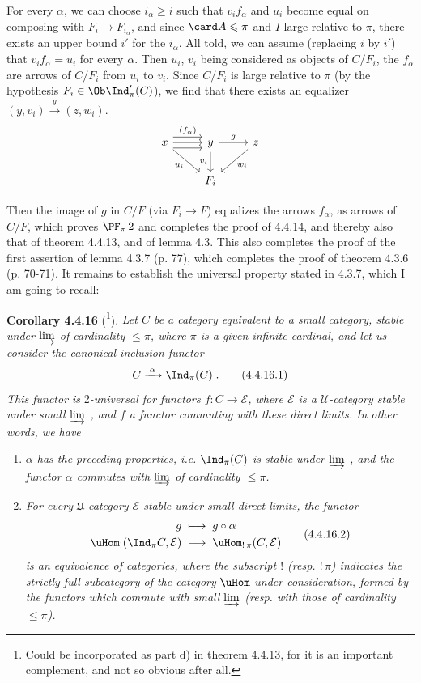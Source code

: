 For every $\alpha$, we can choose $i_\alpha\geqslant i$ such that $v_if_\alpha$ and $u_i$ become equal on composing with $F_i\longrightarrow F_{i_\alpha}$, and since $\card A\leqslant\pi$ and $I$ large relative to $\pi$, there exists an upper bound $i'$ for the $i_\alpha$. All told, we can assume (replacing $i$ by $i'$) that $v_if_\alpha=u_i$ for every $\alpha$. Then $u_i$, $v_i$ being considered as objects of $C/F_i$, the $f_\alpha$ are arrows of $C/F_i$ from $u_i$ to $v_i$. Since $C/F_i$ is large relative to $\pi$ (by the hypothesis $F_i\in\Ob\Ind'_\pi(C)$), we find that there exists an equalizer $(y,v_i)\xrightarrow{\;g\;}(z,w_i)$.
\[
\begin{tikzcd}
x \arrow[r, shift left=2, "(f_\alpha)"] \arrow[r] \arrow[r, shift right=2] \arrow[dr, "u_i"'] & y \arrow[r, "g"] \arrow[d, "v_i"'] & z \arrow[dl, "w_i"] \\
& F_i &
\end{tikzcd}
\]

Then the image of $g$ in $C/F$ (via $F_i\longrightarrow F$) equalizes the arrows $f_\alpha$, as arrows of $C/F$, which proves $\PF_\pi\,2$ and completes the proof of 4.4.14, and thereby also that of theorem 4.4.13, and of lemma 4.3. This also completes the proof of the first assertion of lemma
4.3.7 (p. 77), which completes the proof of theorem 4.3.6 (p. 70-71). It remains to establish the universal property stated in 4.3.7, which I am going to recall:

\textbf{Corollary 4.4.16} (\footnote{Could be incorporated as part d) in theorem 4.4.13, for it is an important complement, and not so obvious after all.}). \textit{Let $C$ be a category equivalent to a small category, stable under $\varinjlim$ of cardinality $\leqslant\pi$, where $\pi$ is a given infinite cardinal, and let us consider the canonical inclusion functor}
\[
C\xrightarrow{\;\alpha\;}\Ind_\pi(C)\;. \tag*{(4.4.16.1)}
\]
\textit{This functor is} 2\textit{-universal for functors $f:C\longrightarrow\mathcal{E}$, where $\mathcal{E}$ is a $\mathcal{U}$-category stable under small $\varinjlim$ , and $f$ a functor commuting with these direct limits. In other words, we have}
\begin{enumerate}
\item[\textit{1$^\circ$)}] \textit{$\alpha$ has the preceding properties, i.e.} $\Ind_\pi(C)$ \textit{is stable under $\varinjlim$ , and the functor $\alpha$ commutes with $\varinjlim$ of cardinality $\leqslant\pi$.}
\item[\textit{2$^\circ$)}] \textit{For every $\mathfrak{U}$-category $\mathcal{E}$ stable under small direct limits, the functor}
\[
\begin{aligned}
g\;&\longmapsto\;g\circ\alpha\\
\uHom_{!}(\Ind_\pi C,\mathcal{E})\;&\longrightarrow\;\uHom_{!\,\pi}(C,\mathcal{E})
\end{aligned}
\tag*{(4.4.16.2)}
\]
\textit{is an equivalence of categories, where the subscript $!$ (resp. $!\,\pi$) indicates the strictly full subcategory of the category} $\uHom$
\textit{under consideration, formed by the functors which commute with small $\varinjlim$ (resp. with those of cardinality $\leqslant\pi$).}
\end{enumerate}

